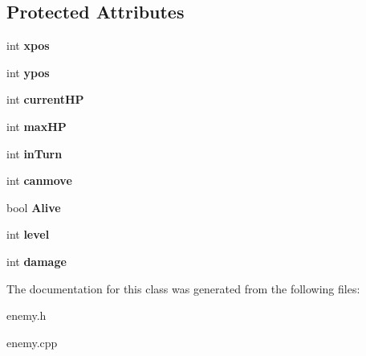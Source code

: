 \subsection*{Protected Attributes}
\begin{DoxyCompactItemize}
\item 
\hypertarget{class_enemy_ab685146410b2972ccab930a522fd9252}{int {\bfseries xpos}}\label{class_enemy_ab685146410b2972ccab930a522fd9252}

\item 
\hypertarget{class_enemy_a7cb1bc241abdacc846ae2313f2a54bbc}{int {\bfseries ypos}}\label{class_enemy_a7cb1bc241abdacc846ae2313f2a54bbc}

\item 
\hypertarget{class_enemy_a2891f607bd7c05774ab7efaf155c1842}{int {\bfseries current\-H\-P}}\label{class_enemy_a2891f607bd7c05774ab7efaf155c1842}

\item 
\hypertarget{class_enemy_a990ecf4cbfdae850b51e6fb2b367ad8e}{int {\bfseries max\-H\-P}}\label{class_enemy_a990ecf4cbfdae850b51e6fb2b367ad8e}

\item 
\hypertarget{class_enemy_a09d68a627f0f664d0dd3ac8063dd5cb3}{int {\bfseries in\-Turn}}\label{class_enemy_a09d68a627f0f664d0dd3ac8063dd5cb3}

\item 
\hypertarget{class_enemy_a5bbd6ff8c998dc4a67badee154c9e453}{int {\bfseries canmove}}\label{class_enemy_a5bbd6ff8c998dc4a67badee154c9e453}

\item 
\hypertarget{class_enemy_a02481d9c8d5b64d4d83556e047fcda7b}{bool {\bfseries Alive}}\label{class_enemy_a02481d9c8d5b64d4d83556e047fcda7b}

\item 
\hypertarget{class_enemy_a4754b00e9ff05f83a293f74324016c17}{int {\bfseries level}}\label{class_enemy_a4754b00e9ff05f83a293f74324016c17}

\item 
\hypertarget{class_enemy_a4969f2e5372ae6840aba5cd0b8059a0a}{int {\bfseries damage}}\label{class_enemy_a4969f2e5372ae6840aba5cd0b8059a0a}

\end{DoxyCompactItemize}


The documentation for this class was generated from the following files\-:\begin{DoxyCompactItemize}
\item 
enemy.\-h\item 
enemy.\-cpp\end{DoxyCompactItemize}
